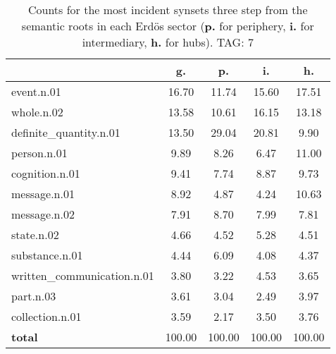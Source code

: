 \begin{table}[h!]
\begin{center}
\begin{tabular}{| l || c | c | c | c |}\hline
 & {\bf g.} & {\bf p.} & {\bf i.} & {\bf h.} \\\hline\hline
event.n.01 & 16.70  & 11.74  & 15.60  & 17.51 \\\hline
whole.n.02 & 13.58  & 10.61  & 16.15  & 13.18 \\\hline
definite\_quantity.n.01 & 13.50  & 29.04  & 20.81  & 9.90 \\\hline
person.n.01 & 9.89  & 8.26  & 6.47  & 11.00 \\\hline
cognition.n.01 & 9.41  & 7.74  & 8.87  & 9.73 \\\hline
message.n.01 & 8.92  & 4.87  & 4.24  & 10.63 \\\hline
message.n.02 & 7.91  & 8.70  & 7.99  & 7.81 \\\hline
state.n.02 & 4.66  & 4.52  & 5.28  & 4.51 \\\hline
substance.n.01 & 4.44  & 6.09  & 4.08  & 4.37 \\\hline
written\_communication.n.01 & 3.80  & 3.22  & 4.53  & 3.65 \\\hline
part.n.03 & 3.61  & 3.04  & 2.49  & 3.97 \\\hline
collection.n.01 & 3.59  & 2.17  & 3.50  & 3.76 \\\hline\hline
{{\bf total}} & 100.00  & 100.00  & 100.00  & 100.00 \\\hline
\end{tabular}
\caption{Counts for the most incident synsets three step from the semantic roots in each Erd\"os sector ({\bf p.} for periphery, {\bf i.} for intermediary, {\bf h.} for hubs). TAG: 7}
\end{center}
\end{table}